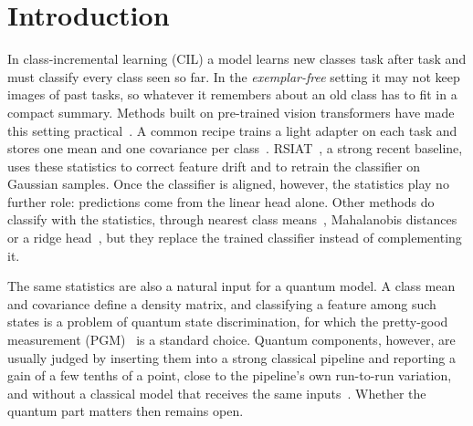 \section{Introduction}\label{sec:intro}
In class-incremental learning (CIL) a model learns new classes task after task and must classify every class
seen so far. In the \emph{exemplar-free} setting it may not keep images of past tasks, so whatever it remembers
about an old class has to fit in a compact summary. Methods built on pre-trained vision transformers have made
this setting practical~\cite{l2p,ease,ssiat}. A common recipe trains a light adapter on each task and stores one
mean and one covariance per class~\cite{zhang2023slca,ssiat,rsiat}. RSIAT~\cite{rsiat}, a strong recent
baseline, uses these statistics to correct feature drift and to retrain the classifier on Gaussian samples. Once
the classifier is aligned, however, the statistics play no further role: predictions come from the linear head
alone. Other methods do classify with the statistics, through nearest class means~\cite{zhou2024aper},
Mahalanobis distances~\cite{goswami2023fecam} or a ridge head~\cite{mcdonnell2023ranpac}, but they replace the
trained classifier instead of complementing it.

The same statistics are also a natural input for a quantum model. A class mean and covariance define a density
matrix, and classifying a feature among such states is a problem of quantum state discrimination, for which the
pretty-good measurement (PGM)~\cite{hausladen1994pgm} is a standard choice. Quantum components, however, are
usually judged by inserting them into a strong classical pipeline and reporting a gain of a few tenths of a
point, close to the pipeline's own run-to-run variation, and without a classical model that receives the same
inputs~\cite{bowles2024better,li2026qkd}. Whether the quantum part matters then remains open.


